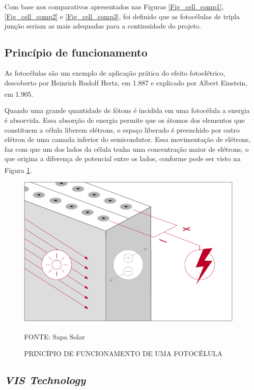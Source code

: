 \documentclass[
	12pt,				%
	openright,			%
	oneside,			%
	a4paper,			%
	english,			%
	french,				%
	spanish,			%
	brazil,				%
	oldfontcommands
	]{abntex2}
\begin{document}
	Com base nos comparativos apresentados nas Figuras \ref{Fig_cell_comp1}, \ref{Fig_cell_comp2} e \ref{Fig_cell_comp3}, foi definido que as fotocélulas de tripla junção seriam as mais adequadas para a continuidade do projeto.
	
\subsection[Princípio de funcionamento]{Princípio de funcionamento}

	As fotocélulas são um exemplo de aplicação prática do efeito fotoelétrico, descoberto por Heinrich Rudolf Hertz, em 1.887 e explicado por Albert Einstein, em 1.905.\textsuperscript{\cite{celula}}
	
	Quando uma grande quantidade de fótons é incidida em uma fotocélula a energia é absorvida. Essa absorção de energia permite que os átomos dos elementos que constituem a célula liberem elétrons, o espaço liberado é preenchido por outro elétron de uma camada inferior do semicondutor. Essa movimentação de elétrons, faz com que um dos lados da célula tenha uma concentração maior de elétrons, o que origina a diferença de potencial entre os lados, conforme pode ser visto na Figura \ref{Fig_PF_Cell}.\textsuperscript{\cite{celula2}}
	
	\begin{figure}[th]
		\caption{PRINCÍPIO DE FUNCIONAMENTO DE UMA FOTOCÉLULA}
		\label{Fig_PF_Cell}
		\centering
		\includegraphics[width=0.6\linewidth]{./figs/fotocelula}
			
		\begin{small}
			FONTE: Sapa Solar\textsuperscript{\cite{celula2}}
		\end{small}		
	\end{figure}
	
\subsection[VIS Technology]{\textit{VIS Technology}}
	
\end{document}
